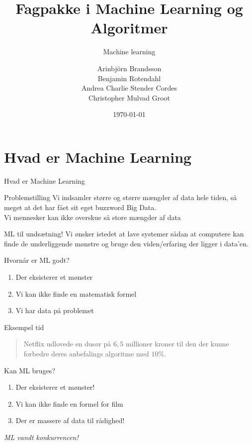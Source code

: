 \documentclass[12pt,t]{beamer}
\title{Fagpakke i Machine Learning og Algoritmer}
\subtitle{Machine learning}
\author{
Arinbjörn Brandsson \\
Benjamin Rotendahl  \\
Andrea Charlie Stender Cordes \\
Christopher Mulvad Groot
}
\date[]{\today}
\begin{document}
\frame[plain]{\titlepage}
 \frame{\tableofcontents}

 \section{Hvad er Machine Learning}
     \begin{frame}[t]{Hvad er Machine Learning}
         \begin{block}{Problemstilling}
             Vi indsamler større og større mængder af data hele tiden, så meget
             at det har fået sit eget buzzword \alert{Big Data}. \\
             \pause
             Vi mennesker kan ikke overskue så store mængder af data
         \end{block}

         \pause

         \begin{block}{ML til undsætning!}
             Vi ønsker istedet at lave systemer sådan at computere kan finde de
             underliggende mønstre og bruge den viden/erfaring der ligger i
             data'en.
         \end{block}

         \pause

         \begin{block}{Hvornår er ML godt?}
             \begin{enumerate}
                 \item Der eksisterer et mønster \pause
                 \item Vi kan ikke finde en matematisk formel \pause
                 \item Vi har data på problemet
             \end{enumerate}
         \end{block}
     \end{frame}

     \begin{frame}[t]{Eksempel tid}
         \begin{quote}
             Netflix udlovede en dusør på $6,5$ millioner kroner til den der
             kunne forbedre deres anbefalings algoritme med $10\%$.
         \end{quote}

         \pause{}

         \begin{block}{Kan ML bruges?}
             \begin{enumerate}
                 \item Der eksisterer et mønster! \pause
                 \item Vi kan ikke finde en formel for film \pause
                 \item Der er massere af data til rådighed!
             \end{enumerate}
         \end{block}
         \pause{}
         \centering \emph{ML vandt konkurrencen!}
     \end{frame}
\end{document}
